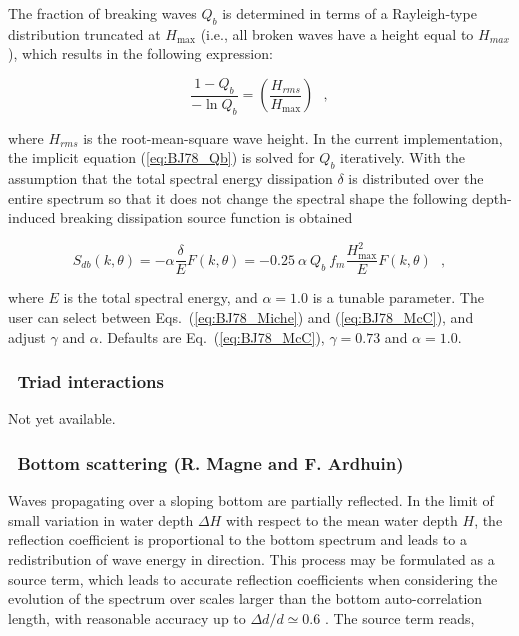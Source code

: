 The fraction of breaking waves $Q_b$ is determined in terms of a Rayleigh-type
distribution truncated at $H_{\max}$ (i.e., all broken waves have a height
equal to $H_{max}$), which results in the following expression:


\begin{equation}
\frac{1 - Q_b}{-\ln Q_b} = \left ( \frac{H_{rms}}{H_{\max}} \right )
\:\:\: , \label{eq:BJ78_Qb}
\end{equation}

\noindent
where $H_{rms}$ is the root-mean-square wave height. In the current
implementation, the implicit equation (\ref{eq:BJ78_Qb}) is solved for $Q_b$
iteratively. With the assumption that the total spectral energy dissipation
$\delta$ is distributed over the entire spectrum so that it does not change
the spectral shape \citep{art:EB96} the following depth-induced breaking
dissipation source function is obtained


\begin{equation}
S_{db} (k,\theta) = - \alpha \frac{\delta}{E} F(k,\theta)
       = - 0.25 \: \alpha \: Q_b \: f_m \frac{H_{\max}^2}{E} F(k,\theta)
\:\:\: , \label{eq:BJ78}
\end{equation}

\noindent
where $E$ is the total spectral energy, and $\alpha = 1.0$ is a tunable
parameter. The user can select between Eqs.~(\ref{eq:BJ78_Miche}) and
(\ref{eq:BJ78_McC}), and adjust $\gamma$ and $\alpha$. Defaults are
Eq.~(\ref{eq:BJ78_McC}), $\gamma = 0.73$ and $\alpha = 1.0$.


\vsssub
\subsubsection{~Triad interactions} \label{sec:triad}
\vsssub

Not yet available.


\vsssub
\subsubsection{~Bottom scattering \hfill {\rm (R. Magne and F. Ardhuin)}}
\label{sec:bscat}
\vsssub

Waves propagating over a sloping bottom are partially reflected.  In the limit
of small variation in water depth $\Delta H$ with respect to the mean water
depth $H$, the reflection coefficient is proportional to the bottom spectrum
\cite{art:Kre49} and leads to a redistribution of wave energy in direction.
This process may be formulated as a source term, which leads to accurate
reflection coefficients when considering the evolution of the spectrum over
scales larger than the bottom auto-correlation length, with reasonable
accuracy up to $\Delta d / d \simeq 0.6$ \citep{art:AM07}. The source term
reads,

